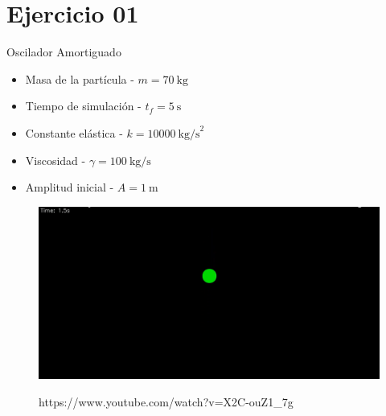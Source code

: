 \section{Ejercicio 01}\label{sec:ejercicio1}

\begin{frame}{Oscilador Amortiguado}
    \begin{multicols}{2}
        {
        \begin{itemize}
            \item Masa de la partícula - $m = 70\ \text{kg}$
            \item Tiempo de simulación - $t_f = 5\ \text{s}$
            \item Constante elástica - $k = 10000\ \text{kg/s}^2$
            \item Viscosidad - $\gamma = 100\ \text{kg/s}$
            \item Amplitud inicial - $A = 1\ \text{m}$
        \end{itemize}
        }
        {
        \begin{figure}[H]
            \centering
            \includegraphics[width=1\linewidth]{pic/00-ejercicio1/thumbnail.png}\\
            \captionsetup{labelformat=empty}
            \caption{https://www.youtube.com/watch?v=X2C-ouZ1_7g}
        \end{figure}
        }
    \end{multicols}
\end{frame}


